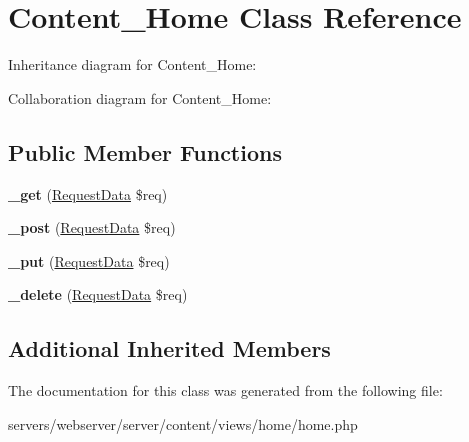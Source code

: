 \hypertarget{class_lora_1_1_content_1_1_content___home}{}\section{Content\+\_\+\+Home Class Reference}
\label{class_lora_1_1_content_1_1_content___home}


Inheritance diagram for Content\+\_\+\+Home\+:


Collaboration diagram for Content\+\_\+\+Home\+:
\subsection*{Public Member Functions}
\begin{DoxyCompactItemize}
\item 
\mbox{\label{class_lora_1_1_content_1_1_content___home_a3ad4bf1b146a3180b34d1327ff2abf69}} 
{\bfseries \+\_\+get} (\hyperlink{class_request_data}{Request\+Data} \$req)
\item 
\mbox{\label{class_lora_1_1_content_1_1_content___home_a50751d47a139282d1c3b08cab1b6562e}} 
{\bfseries \+\_\+post} (\hyperlink{class_request_data}{Request\+Data} \$req)
\item 
\mbox{\label{class_lora_1_1_content_1_1_content___home_a2affcc8f31c13147c33450193b229194}} 
{\bfseries \+\_\+put} (\hyperlink{class_request_data}{Request\+Data} \$req)
\item 
\mbox{\label{class_lora_1_1_content_1_1_content___home_ab8ddc6de1e04524212f7d55893f78864}} 
{\bfseries \+\_\+delete} (\hyperlink{class_request_data}{Request\+Data} \$req)
\end{DoxyCompactItemize}
\subsection*{Additional Inherited Members}


The documentation for this class was generated from the following file\+:\begin{DoxyCompactItemize}
\item 
servers/webserver/server/content/views/home/home.\+php\end{DoxyCompactItemize}
